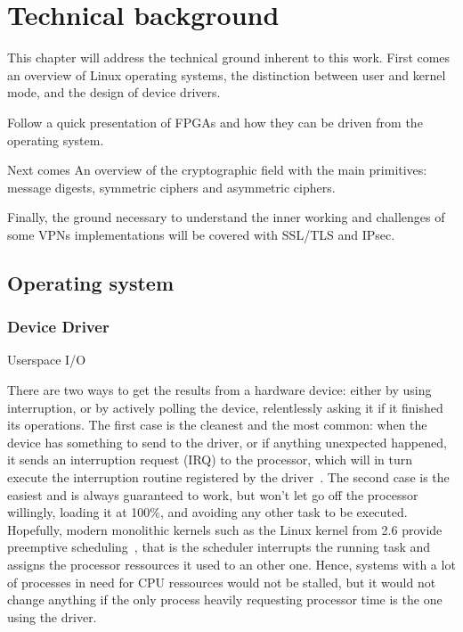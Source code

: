 \chapter{Technical background}\label{chap:theory}

This chapter will address the technical ground inherent to this work.
First comes an overview of Linux operating systems, the distinction between user and kernel mode, and the design of device drivers.

\noindent Follow a quick presentation of FPGAs and how they can be driven from the operating system.

\noindent Next comes An overview of the cryptographic field with the main primitives: message digests, symmetric ciphers and asymmetric ciphers.

\noindent Finally, the ground necessary to understand the inner working and challenges of some VPNs implementations will be covered with SSL/TLS and IPsec.



\section{Operating system}



\subsection{Device Driver}\label{sec:theory-driver}
Userspace I/O~\cite{koch2011}

There are two ways to get the results from a hardware device: either by using interruption, or by actively polling the device, relentlessly asking it if it finished its operations.
The first case is the cleanest and the most common: when the device has something to send to the driver, or if anything unexpected happened, it sends an interruption request (IRQ) to the processor, which will in turn execute the interruption routine registered by the driver~\citep[chap. 10]{Corbet:2005:LDD:1209083}.
The second case is the easiest and is always guaranteed to work, but won't let go off the processor willingly, loading it at 100\%, and avoiding any other task to be executed.
Hopefully, modern monolithic kernels such as the Linux kernel from 2.6 provide preemptive scheduling~\cite{Santhanam2003}, that is the scheduler interrupts the running task and assigns the processor ressources it used to an other one.
Hence, systems with a lot of processes in need for CPU ressources would not be stalled, but it would not change anything if the only process heavily requesting processor time is the one using the driver.



